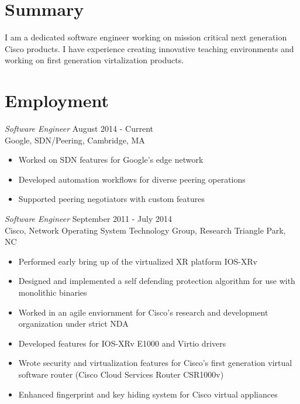 \documentclass[line,margin]{res}
\begin{document}
\address{}
\address{Email: vtwoods@gmail.com --- Cell: }

 
\begin{resume}

\section{Summary} I am a dedicated software engineer working on mission critical next generation Cisco products.  I have experience creating innovative teaching environments and working on first generation virtalization products.

\section{Employment}
         {\sl Software Engineer} \hfill August 2014 - Current \\
        Google, SDN/Peering, Cambridge, MA
        \begin{itemize}  \itemsep -2pt %
             \item Worked on SDN features for Google's edge network
             \item Developed automation workflows for diverse peering operations
             \item Supported peering negotiators with custom features
        \end{itemize}
         {\sl Software Engineer} \hfill September 2011 - July 2014 \\
        Cisco, Network Operating System Technology Group, Research Triangle Park, NC
        \begin{itemize}  \itemsep -2pt %
             \item Performed early bring up of the virtualized XR platform IOS-XRv
             \item Designed and implemented a self defending protection algorithm for use with monolithic binaries
             \item Worked in an agile enviornment for Cisco's research and development organization under strict NDA
             \item Developed features for IOS-XRv E1000 and Virtio drivers
             \item Wrote security and virtualization features for Cisco's first generation virtual software router (Cisco Cloud Services Router CSR1000v)  
             \item Enhanced fingerprint and key hiding system for Cisco virtual appliances

\end{itemize}
\end{resume}
\end{document}

